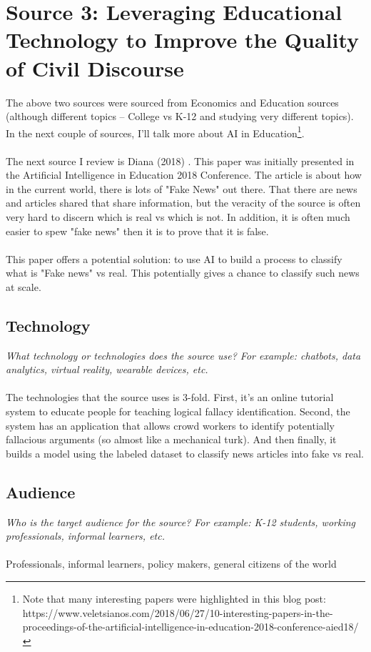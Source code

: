 \documentclass[12pt, final]{article}
\begin{document}
\section{Source 3: Leveraging Educational Technology to Improve the Quality of Civil Discourse} \label{Source 3}
The above two sources were sourced from Economics and Education sources (although different topics -- College vs K-12 and studying very different topics). In the next couple of sources, I'll talk more about AI in Education\footnote{Note that many interesting papers were highlighted in this blog post: https://www.veletsianos.com/2018/06/27/10-interesting-papers-in-the-proceedings-of-the-artificial-intelligence-in-education-2018-conference-aied18/}. 
\\
\\
The next source I review is Diana (2018) \cite{Diana}. This paper was initially presented in the Artificial Intelligence in Education 2018 Conference. The article is about how in the current world, there is lots of "Fake News" out there. That there are news and articles shared that share information, but the veracity of the source is often very hard to discern which is real vs which is not. In addition, it is often much easier to spew "fake news" then it is to prove that it is false.
\\
\\
This paper offers a potential solution: to use AI to build a process to classify what is "Fake news" vs real. This potentially gives a chance to classify such news at scale.

\subsection{Technology}
\textit{What technology or technologies does the source use? For example: chatbots, data analytics, virtual reality, wearable devices, etc.}
\\
\\
The technologies that the source uses is 3-fold. First, it's an online tutorial system to educate people for teaching logical fallacy identification. Second, the system has an application that allows crowd workers to identify potentially fallacious arguments (so almost like a mechanical turk). And then finally, it builds a model using the labeled dataset to classify news articles into fake vs real.

\subsection{Audience}
\textit{Who is the target audience for the source? For example: K-12 students, working professionals, informal learners, etc.}
\\
\\
Professionals, informal learners, policy makers, general citizens of the world
\end{document}
